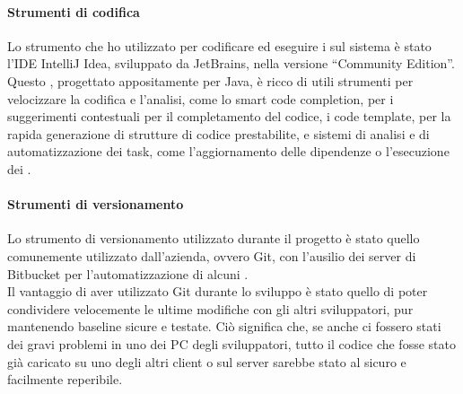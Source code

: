 		\paragraph{Strumenti di codifica}
		Lo strumento che ho utilizzato per codificare ed eseguire i  sul sistema è stato l'IDE IntelliJ Idea, sviluppato da JetBrains, nella versione  ``Community Edition''. Questo , progettato appositamente per Java, è ricco di utili strumenti per velocizzare la codifica e l'analisi, come lo smart code completion, per i suggerimenti contestuali per il completamento del codice, i code template, per la rapida generazione di strutture di codice prestabilite, e sistemi di analisi e di automatizzazione dei task, come l'aggiornamento delle dipendenze o l'esecuzione dei .

		\paragraph{Strumenti di versionamento}
		Lo strumento di versionamento utilizzato durante il progetto è stato quello comunemente utilizzato dall'azienda, ovvero Git, con l'ausilio dei server di Bitbucket per l'automatizzazione di alcuni .
		\\
		Il vantaggio di aver utilizzato Git durante lo sviluppo è stato quello di poter condividere velocemente le ultime modifiche con gli altri sviluppatori, pur mantenendo baseline sicure e testate. Ciò significa che, se anche ci fossero stati dei gravi problemi in uno dei PC degli sviluppatori, tutto il codice che fosse stato già caricato su uno degli altri client o sul server sarebbe stato al sicuro e facilmente reperibile.
		
